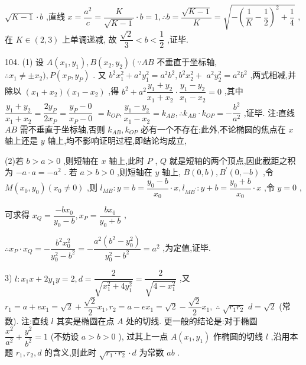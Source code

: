 $\sqrt{K - 1} \cdot  b$ ,直线 $x = \dfrac{{a}^{2}}{c} = \dfrac{K}{\sqrt{K - 1}} \cdot  b = 1,\therefore b = \dfrac{\sqrt{K - 1}}{K} = \sqrt{-{\left( \dfrac{1}{K} - \dfrac{1}{2}\right) }^{2} + \dfrac{1}{4}}$ ,在 $K \in  \left( {2,3}\right)$ 上单调递减, 故 $\dfrac{\sqrt{2}}{3} < b < \dfrac{1}{2}$ ,证毕.

104. (1) 设 $A\left( {{x}_{1},{y}_{1}}\right) ,B\left( {{x}_{2},{y}_{2}}\right) \left( {\because {AB}}\right.$ 不垂直于坐标轴, $\therefore {x}_{1} \neq   \pm  {x}_{2}),P\left( {{x}_{P},{y}_{P}}\right)$ . 又 ${b}^{2}{x}_{1}^{2} + {a}^{2}{y}_{1}^{2} = {a}^{2}{b}^{2},{b}^{2}{x}_{2}^{2} +$  ${a}^{2}{y}_{2}^{2} = {a}^{2}{b}^{2}$ ,两式相减,并除以 $\left( {{x}_{1} + {x}_{2}}\right) \left( {{x}_{1} - {x}_{2}}\right)$ ,得 ${b}^{2} + {a}^{2}\dfrac{{y}_{1} + {y}_{2}}{{x}_{1} + {x}_{2}} \cdot  \dfrac{{y}_{1} - {y}_{2}}{{x}_{1} - {x}_{2}} = 0$ ,其中 $\dfrac{{y}_{1} + {y}_{2}}{{x}_{1} + {x}_{2}} = \dfrac{2{y}_{P}}{2{x}_{P}} = \dfrac{{y}_{P} - 0}{{x}_{P} - 0}$  $= {k}_{OP},\dfrac{{y}_{1} - {y}_{2}}{{x}_{1} - {x}_{2}} = {k}_{AB},\therefore {k}_{AB} \cdot  {k}_{OP} =  - \dfrac{{b}^{2}}{{a}^{2}}$ ,证毕. 注:直线 ${AB}$ 需不垂直于坐标轴,否则 ${k}_{AB},{k}_{OP}$ 必有一个不存在;此外,不论椭圆的焦点在 $x$ 轴上还是 $y$ 轴上,均不影响证明过程,即结论均成立,

(2)若 $b > a > 0$ ,则短轴在 $x$ 轴上,此时 $P$ , $Q$ 就是短轴的两个顶点,因此截距之积为 $- a \cdot  a =  - {a}^{2}$ . 若 $a > b > 0$ ,则短轴在 $y$ 轴上, $B\left( {0,b}\right) ,{B}^{\prime }\left( {0, - b}\right)$ ,令 $M\left( {{x}_{0},{y}_{0}}\right) \left( {{x}_{0} \neq  0}\right)$ ,则 ${l}_{MB} : y = b = \dfrac{{y}_{0} - b}{{x}_{0}} \cdot  x,{l}_{M{B}^{\prime }} : y + b = \dfrac{{y}_{0} + b}{{x}_{0}} \cdot  x$ ,令 $y = 0$ ,

可求得 ${x}_{Q} = \dfrac{-b{x}_{0}}{{y}_{0} - b},{x}_{P} = \dfrac{b{x}_{0}}{{y}_{0} + b}$ ,

$\therefore {x}_{P} \cdot  {x}_{Q} =  - \dfrac{{b}^{2}{x}_{0}^{2}}{{y}_{0}^{2} - {b}^{2}} =  - \dfrac{{a}^{2}\left( {{b}^{2} - {y}_{0}^{2}}\right) }{{y}_{0}^{2} - {b}^{2}} = {a}^{2}$ ,为定值,证毕.

3) $l : {x}_{1}x + 2{y}_{1}y = 2,d = \dfrac{2}{\sqrt{{x}_{1}^{2} + 4{y}_{1}^{2}}} = \dfrac{2}{\sqrt{4 - {x}_{1}^{2}}}$ ,又 ${r}_{1} = a + e{x}_{1} = \sqrt{2} + \dfrac{\sqrt{2}}{2}{x}_{1},{r}_{2} = a - e{x}_{1} = \sqrt{2} - \dfrac{\sqrt{2}}{2}{x}_{1},\;\therefore \;\sqrt{{r}_{1}{r}_{2}}$  $d = \sqrt{2}$ (常数). 注:直线 $l$ 其实是椭圆在点 $A$ 处的切线. 更一般的结论是:对于椭圆 $\dfrac{{x}^{2}}{{a}^{2}} + \dfrac{{y}^{2}}{{b}^{2}} = 1$ (不妨设 $a > b > 0$ ), 过其上一点 $A\left( {{x}_{1},{y}_{1}}\right)$ 作椭圆的切线 $l$ ,沿用本题 ${r}_{1},{r}_{2},d$ 的含义,则此时 $\sqrt{{r}_{1} \cdot  {r}_{2}} \cdot  d$ 为常数 ${ab}$ .

